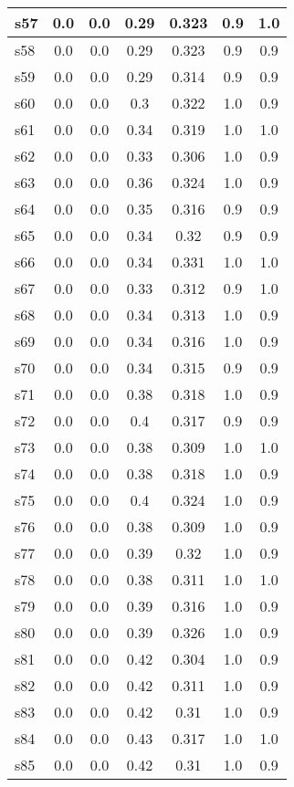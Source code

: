 \documentclass{article}
\begin{document}
\begin{tabular}{|l|c|c|c|c|c|c|}
\hline
s57 &0.0 & 0.0 & 0.29 & 0.323 & 0.9 & 1.0\\
\hline
s58 &0.0 & 0.0 & 0.29 & 0.323 & 0.9 & 0.9\\
\hline
s59 &0.0 & 0.0 & 0.29 & 0.314 & 0.9 & 0.9\\
\hline
s60 &0.0 & 0.0 & 0.3 & 0.322 & 1.0 & 0.9\\
\hline
s61 &0.0 & 0.0 & 0.34 & 0.319 & 1.0 & 1.0\\
\hline
s62 &0.0 & 0.0 & 0.33 & 0.306 & 1.0 & 0.9\\
\hline
s63 &0.0 & 0.0 & 0.36 & 0.324 & 1.0 & 0.9\\
\hline
s64 &0.0 & 0.0 & 0.35 & 0.316 & 0.9 & 0.9\\
\hline
s65 &0.0 & 0.0 & 0.34 & 0.32 & 0.9 & 0.9\\
\hline
s66 &0.0 & 0.0 & 0.34 & 0.331 & 1.0 & 1.0\\
\hline
s67 &0.0 & 0.0 & 0.33 & 0.312 & 0.9 & 1.0\\
\hline
s68 &0.0 & 0.0 & 0.34 & 0.313 & 1.0 & 0.9\\
\hline
s69 &0.0 & 0.0 & 0.34 & 0.316 & 1.0 & 0.9\\
\hline
s70 &0.0 & 0.0 & 0.34 & 0.315 & 0.9 & 0.9\\
\hline
s71 &0.0 & 0.0 & 0.38 & 0.318 & 1.0 & 0.9\\
\hline
s72 &0.0 & 0.0 & 0.4 & 0.317 & 0.9 & 0.9\\
\hline
s73 &0.0 & 0.0 & 0.38 & 0.309 & 1.0 & 1.0\\
\hline
s74 &0.0 & 0.0 & 0.38 & 0.318 & 1.0 & 0.9\\
\hline
s75 &0.0 & 0.0 & 0.4 & 0.324 & 1.0 & 0.9\\
\hline
s76 &0.0 & 0.0 & 0.38 & 0.309 & 1.0 & 0.9\\
\hline
s77 &0.0 & 0.0 & 0.39 & 0.32 & 1.0 & 0.9\\
\hline
s78 &0.0 & 0.0 & 0.38 & 0.311 & 1.0 & 1.0\\
\hline
s79 &0.0 & 0.0 & 0.39 & 0.316 & 1.0 & 0.9\\
\hline
s80 &0.0 & 0.0 & 0.39 & 0.326 & 1.0 & 0.9\\
\hline
s81 &0.0 & 0.0 & 0.42 & 0.304 & 1.0 & 0.9\\
\hline
s82 &0.0 & 0.0 & 0.42 & 0.311 & 1.0 & 0.9\\
\hline
s83 &0.0 & 0.0 & 0.42 & 0.31 & 1.0 & 0.9\\
\hline
s84 &0.0 & 0.0 & 0.43 & 0.317 & 1.0 & 1.0\\
\hline
s85 &0.0 & 0.0 & 0.42 & 0.31 & 1.0 & 0.9\\

\end{tabular}
\end{document}
